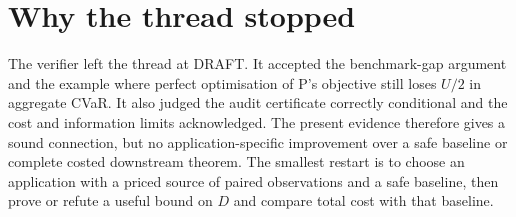 \documentclass{article}
\begin{document}
\section{Why the thread stopped}

The verifier left the thread at DRAFT. It accepted the benchmark-gap argument and the example where perfect
optimisation of P's objective still loses \(U/2\) in aggregate CVaR. It also judged the audit certificate
correctly conditional and the cost and information limits acknowledged. The present evidence therefore gives a
sound connection, but no application-specific improvement over a safe baseline or complete costed downstream
theorem. The smallest restart is to choose an application with a priced source of paired observations and a
safe baseline, then prove or refute a useful bound on \(D\) and compare total cost with that baseline.



\end{document}
